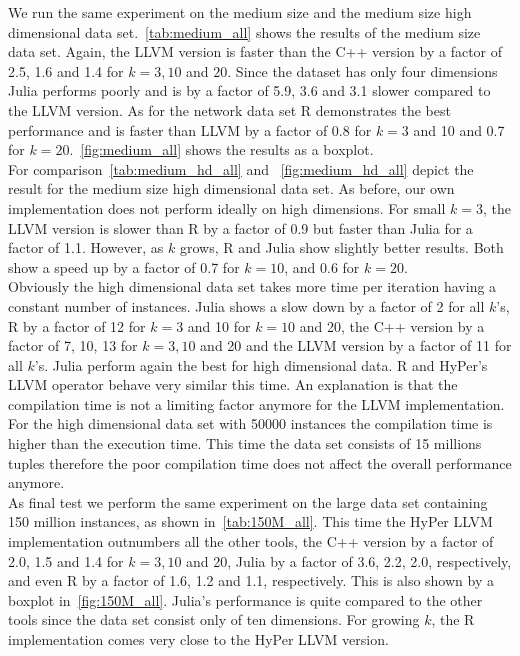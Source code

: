 We run the same experiment on the medium size and the medium size high dimensional data set.~\autoref{tab:medium_all} shows the results of the medium size data set. Again, the LLVM version is faster than the C++ version by a factor of 2.5, 1.6 and 1.4 for $k = 3, 10$ and $20$. Since the dataset has only four dimensions Julia performs poorly and is by a factor of 5.9, 3.6 and 3.1 slower compared to the LLVM version. As for the network data set R demonstrates the best performance and is faster than LLVM by a factor of 0.8 for $k = 3$ and 10 and 0.7 for $k = 20$.~\autoref{fig:medium_all} shows the results as a boxplot.
\\
For comparison~\autoref{tab:medium_hd_all} and ~\autoref{fig:medium_hd_all} depict the result for the medium size high dimensional data set. As before, our own implementation does not perform ideally on high dimensions. For small $k = 3$, the LLVM version is slower than R by a factor of 0.9 but faster than Julia for a factor of 1.1. However, as $k$ grows, R and Julia show slightly better results. Both show a speed up by a factor of 0.7 for $k = 10$, and 0.6 for $k = 20$. 
\\
Obviously the high dimensional data set takes more time per iteration having a constant number of instances. Julia shows a slow down by a factor of 2 for all $k$'s, R by a factor of 12 for $k = 3$ and 10 for $k = 10$ and 20, the C++ version by a factor of 7, 10, 13 for $k = 3, 10$ and 20 and the LLVM version by a factor of 11 for all $k$'s. Julia perform again the best for high dimensional data. R and HyPer's LLVM operator behave very similar this time. An explanation is that the compilation time is not a limiting factor anymore for the LLVM implementation. For the high dimensional data set with 50000 instances the compilation time is higher than the execution time. This time the data set consists of 15 millions tuples therefore the poor compilation time does not affect the overall performance anymore.
\\
As final test we perform the same experiment on the large data set containing 150 million instances, as shown in~\autoref{tab:150M_all}. This time the HyPer LLVM implementation outnumbers all the other tools, the C++ version by a factor of 2.0, 1.5 and 1.4 for $k = 3, 10$ and 20, Julia by a factor of 3.6, 2.2, 2.0, respectively, and even R by a factor of 1.6, 1.2 and 1.1, respectively. This is also shown by a boxplot in~\autoref{fig:150M_all}. Julia's performance is quite compared to the other tools since the data set consist only of ten dimensions. For growing $k$, the R implementation comes very close to the HyPer LLVM version.
